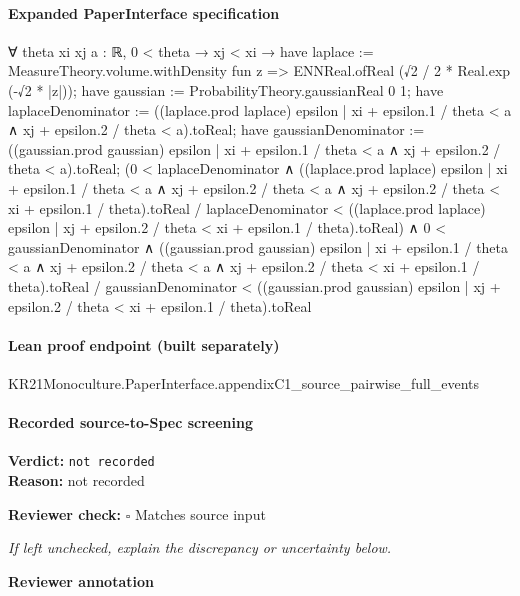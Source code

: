 \documentclass[10pt]{article}
\newcommand{\reviewerbox}{%
  \par\noindent\fbox{\parbox{0.96\linewidth}{\rule{0pt}{0.38in}}}\par
}
\newcommand{\reviewmatch}[1]{%
  \par\noindent\textbf{Reviewer check:} $\square$\; #1\par
  \noindent\emph{If left unchecked, explain the discrepancy or uncertainty below.}\par
}
\begin{document}
\paragraph{Expanded PaperInterface specification}
\begin{ReviewVerbatim}
∀ {theta xi xj a : ℝ},
  0 < theta →
    xj < xi →
      have laplace := MeasureTheory.volume.withDensity fun z => ENNReal.ofReal (√2 / 2 * Real.exp (-√2 * |z|));
      have gaussian := ProbabilityTheory.gaussianReal 0 1;
      have laplaceDenominator :=
        ((laplace.prod laplace) {epsilon | xi + epsilon.1 / theta < a ∧ xj + epsilon.2 / theta < a}).toReal;
      have gaussianDenominator :=
        ((gaussian.prod gaussian) {epsilon | xi + epsilon.1 / theta < a ∧ xj + epsilon.2 / theta < a}).toReal;
      (0 < laplaceDenominator ∧
          ((laplace.prod laplace)
                  {epsilon |
                    xi + epsilon.1 / theta < a ∧
                      xj + epsilon.2 / theta < a ∧ xj + epsilon.2 / theta < xi + epsilon.1 / theta}).toReal /
              laplaceDenominator <
            ((laplace.prod laplace) {epsilon | xj + epsilon.2 / theta < xi + epsilon.1 / theta}).toReal) ∧
        0 < gaussianDenominator ∧
          ((gaussian.prod gaussian)
                  {epsilon |
                    xi + epsilon.1 / theta < a ∧
                      xj + epsilon.2 / theta < a ∧ xj + epsilon.2 / theta < xi + epsilon.1 / theta}).toReal /
              gaussianDenominator <
            ((gaussian.prod gaussian) {epsilon | xj + epsilon.2 / theta < xi + epsilon.1 / theta}).toReal
\end{ReviewVerbatim}

\paragraph{Lean proof endpoint (built separately)}\begin{ReviewVerbatim}
KR21Monoculture.PaperInterface.appendixC1_source_pairwise_full_events
\end{ReviewVerbatim}

\paragraph{Recorded source-to-Spec screening}
\textbf{Verdict:} \texttt{not recorded}
\\
\textbf{Reason:} not recorded
\reviewmatch{Matches source input}
\noindent\textbf{Reviewer annotation}\par
\reviewerbox
\clearpage
\hypertarget{source-claim-6a2a92d325b21a46}{}
\end{document}
